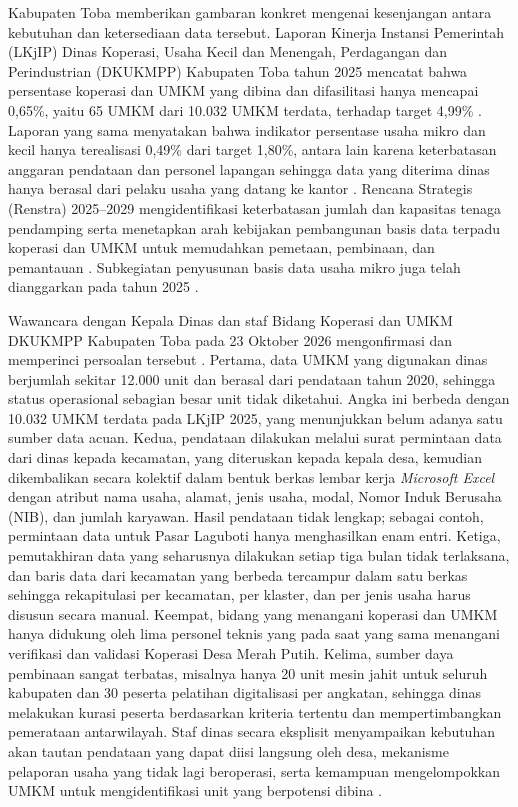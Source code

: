 \documentclass[12pt,a4paper]{report}
\begin{document}
Kabupaten Toba memberikan gambaran konkret mengenai kesenjangan antara kebutuhan dan ketersediaan data tersebut. Laporan Kinerja Instansi Pemerintah (LKjIP) Dinas Koperasi, Usaha Kecil dan Menengah, Perdagangan dan Perindustrian (DKUKMPP) Kabupaten Toba tahun 2025 mencatat bahwa persentase koperasi dan UMKM yang dibina dan difasilitasi hanya mencapai 0,65\%, yaitu 65 UMKM dari 10.032 UMKM terdata, terhadap target 4,99\% \cite[hlm.~50]{lkjip2025toba}. Laporan yang sama menyatakan bahwa indikator persentase usaha mikro dan kecil hanya terealisasi 0,49\% dari target 1,80\%, antara lain karena keterbatasan anggaran pendataan dan personel lapangan sehingga data yang diterima dinas hanya berasal dari pelaku usaha yang datang ke kantor \cite[hlm.~107]{lkjip2025toba}. Rencana Strategis (Renstra) 2025--2029 mengidentifikasi keterbatasan jumlah dan kapasitas tenaga pendamping \cite[hlm.~45]{renstra2025toba} serta menetapkan arah kebijakan pembangunan basis data terpadu koperasi dan UMKM untuk memudahkan pemetaan, pembinaan, dan pemantauan \cite[hlm.~79]{renstra2025toba}. Subkegiatan penyusunan basis data usaha mikro juga telah dianggarkan pada tahun 2025 \cite[hlm.~33]{lkjip2025toba}.

Wawancara dengan Kepala Dinas dan staf Bidang Koperasi dan UMKM DKUKMPP Kabupaten Toba pada 23 Oktober 2026 mengonfirmasi dan memperinci persoalan tersebut \cite{wawancarakadis2026,wawancarastaf2026}. Pertama, data UMKM yang digunakan dinas berjumlah sekitar 12.000 unit dan berasal dari pendataan tahun 2020, sehingga status operasional sebagian besar unit tidak diketahui. Angka ini berbeda dengan 10.032 UMKM terdata pada LKjIP 2025, yang menunjukkan belum adanya satu sumber data acuan. Kedua, pendataan dilakukan melalui surat permintaan data dari dinas kepada kecamatan, yang diteruskan kepada kepala desa, kemudian dikembalikan secara kolektif dalam bentuk berkas lembar kerja \textit{Microsoft Excel} dengan atribut nama usaha, alamat, jenis usaha, modal, Nomor Induk Berusaha (NIB), dan jumlah karyawan. Hasil pendataan tidak lengkap; sebagai contoh, permintaan data untuk Pasar Laguboti hanya menghasilkan enam entri. Ketiga, pemutakhiran data yang seharusnya dilakukan setiap tiga bulan tidak terlaksana, dan baris data dari kecamatan yang berbeda tercampur dalam satu berkas sehingga rekapitulasi per kecamatan, per klaster, dan per jenis usaha harus disusun secara manual. Keempat, bidang yang menangani koperasi dan UMKM hanya didukung oleh lima personel teknis yang pada saat yang sama menangani verifikasi dan validasi Koperasi Desa Merah Putih. Kelima, sumber daya pembinaan sangat terbatas, misalnya hanya 20 unit mesin jahit untuk seluruh kabupaten dan 30 peserta pelatihan digitalisasi per angkatan, sehingga dinas melakukan kurasi peserta berdasarkan kriteria tertentu dan mempertimbangkan pemerataan antarwilayah. Staf dinas secara eksplisit menyampaikan kebutuhan akan tautan pendataan yang dapat diisi langsung oleh desa, mekanisme pelaporan usaha yang tidak lagi beroperasi, serta kemampuan mengelompokkan UMKM untuk mengidentifikasi unit yang berpotensi dibina \cite{wawancarastaf2026}.
\end{document}
